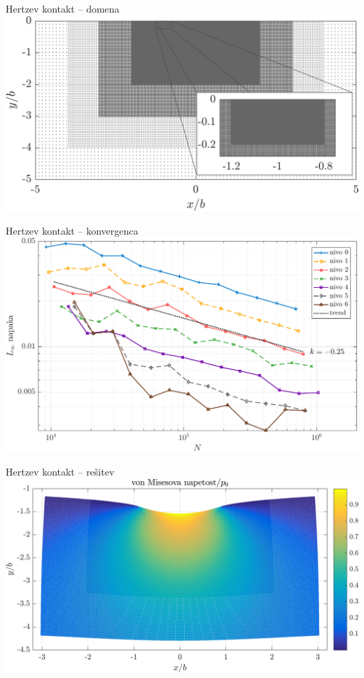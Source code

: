 \begin{frame}{Hertzev kontakt -- domena}
  \centering
  \vspace{3ex}
  \includegraphics[width=\textwidth]{resources/hertzian_refined_domain.png}
\end{frame}

\begin{frame}{Hertzev kontakt -- konvergenca}
  \centering
  \vspace{3ex}
  \includegraphics[width=\textwidth]{resources/hertzian_refine_levels_convergence.pdf}
\end{frame}

\begin{frame}{Hertzev kontakt -- rešitev}
  \centering
  \vspace{3.5ex}
  \includegraphics[width=\textwidth]{resources/hertzian_solution_deformed_vm.png}
\end{frame}

